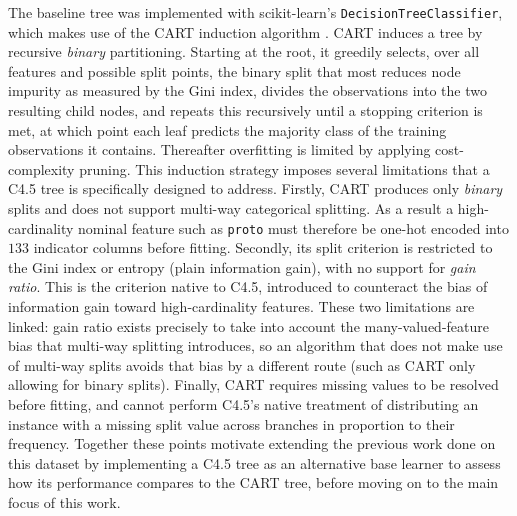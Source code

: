 \documentclass[conference]{IEEEtran}
\begin{document}
The baseline tree was implemented with scikit-learn's \texttt{DecisionTreeClassifier},
which makes use of the CART induction algorithm \cite{breiman1984cart}. CART induces a tree
by recursive \emph{binary} partitioning. Starting at the root, it greedily selects, over all
features and possible split points, the binary split that most reduces node impurity as
measured by the Gini index, divides the observations into the two resulting child nodes,
and repeats this recursively until a stopping criterion is met, at which point each leaf
predicts the majority class of the training observations it contains. Thereafter overfitting is
limited by applying cost-complexity pruning.
This induction strategy imposes several
limitations that a C4.5 tree \cite{quinlan1993c45} is specifically designed to address.
Firstly, CART produces only \emph{binary} splits and does not support multi-way
categorical splitting. As a result a high-cardinality nominal feature such as \texttt{proto} must
therefore be one-hot encoded into $133$ indicator columns before fitting. Secondly,
its split criterion is restricted to the Gini index or entropy (plain information gain),
with no support for \emph{gain ratio}. This is the criterion native to C4.5, introduced to
counteract the bias of information gain toward high-cardinality features. 
These two
limitations are linked: gain ratio exists precisely to take into account the many-valued-feature
bias that multi-way splitting introduces, so an algorithm that does not make use of multi-way splits
avoids that bias by a different route (such as CART only allowing for binary splits). 
Finally, CART requires missing values to be resolved before
fitting, and cannot perform C4.5's native treatment of distributing an instance with a
missing split value across branches in proportion to their frequency. Together these
points motivate extending the previous work done on this dataset by implementing a C4.5 tree 
as an alternative base learner to assess how its performance compares to the CART tree, before
moving on to the main focus of this work.
\end{document}

